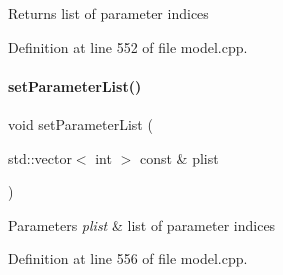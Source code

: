 \begin{DoxyReturn}{Returns}
list of parameter indices 
\end{DoxyReturn}


Definition at line 552 of file model.\+cpp.

\mbox{\label{classamici_1_1_model_a2afe974183e4bccaf746f6409941fe8f}} 
\paragraph{\texorpdfstring{set\+Parameter\+List()}{setParameterList()}}
{\footnotesize\ttfamily void set\+Parameter\+List (\begin{DoxyParamCaption}\item[{std\+::vector$<$ int $>$ const \&}]{plist }\end{DoxyParamCaption})}


\begin{DoxyParams}{Parameters}
{\em plist} & list of parameter indices \\
\hline
\end{DoxyParams}


Definition at line 556 of file model.\+cpp.

